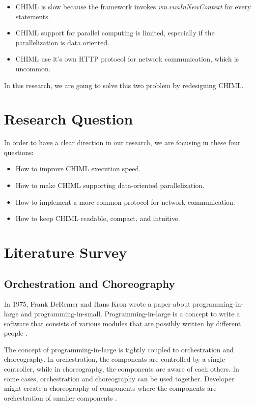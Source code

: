 \documentclass[conference]{IEEEtran}
\begin{document}
\begin{itemize}
    \item CHIML is slow because the framework invokes {\it vm.runInNewContext } for every statements.
    \item CHIML support for parallel computing is limited, especially if the parallelization is data oriented.
    \item CHIML use it's own HTTP protocol for network communication, which is uncommon.
\end{itemize}

In this research, we are going to solve this two problem by redesigning CHIML.

\section{Research Question}

In order to have a clear direction in our research, we are focusing in these four questions:

\begin{itemize}
    \item How to improve CHIML execution speed.
    \item How to make CHIML supporting data-oriented parallelization.
    \item How to implement a more common protocol for network communication.
    \item How to keep CHIML readable, compact, and intuitive.
\end{itemize}


\section{Literature Survey}

\subsection{Orchestration and Choreography}

In 1975, Frank DeRemer and Hans Kron wrote a paper about programming-in-large and programming-in-small. Programming-in-large is a concept to write a software that consists of various modules that are possibly written by different people \cite{DeRemer:1975:PLV:390016.808431}.

The concept of programming-in-large is tightly coupled to orchestration and choreography. In orchestration, the components are controlled by a single controller, while in choreography, the components are aware of each others. In some cases, orchestration and choreography can be used together. Developer might create a choreography of components where the components are orchestration of smaller components \cite{orchestrationvschoreography}. 
\end{document}
